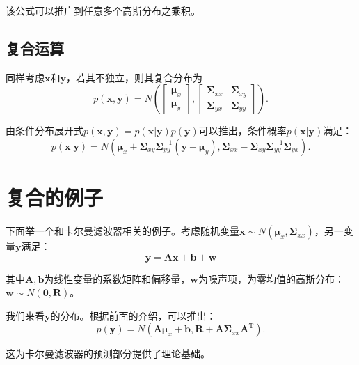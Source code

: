 该公式可以推广到任意多个高斯分布之乘积。

\subsection{复合运算}
同样考虑$\bm{x}$和$\bm{y}$，若其不独立，则其复合分布为
\begin{equation}
p(\bm{x}, \bm{y}) = N\left( {\left[ {\begin{array}{*{20}{c}}
		{{\bm{\mu}_x}}\\
		{{\bm{\mu}_y}}
		\end{array}} \right],\left[ {\begin{array}{*{20}{c}}
		{{\bm{\Sigma}_{xx}}}&{{\bm{\Sigma}_{xy}}}\\
		{{\bm{\Sigma}_{yx}}}&{{\bm{\Sigma}_{yy}}}
		\end{array}} \right]} \right).
\end{equation}

由条件分布展开式$p\left( {\bm{x}, \bm{y}} \right) = p\left( {\bm{x}|\bm{y}} \right)p\left( \bm{y} \right)$可以推出，条件概率$p(\bm{x}|\bm{y})$满足：
\begin{equation}
p\left( {\bm{x} | \bm{y} } \right) = N\left( {{\bm{\mu}_x} + {\bm{\Sigma}_{xy}} \bm{\Sigma}_{yy}^{ - 1} \left( {\bm{y} - {\bm{\mu}_y}} \right),{\bm{\Sigma}_{xx}} - {\bm{\Sigma}_{xy}} \bm{\Sigma}_{yy}^{ - 1}{\bm{\Sigma}_{yx}}} \right).
\end{equation}

\section{复合的例子}
\label{sec:gauss-example}
下面举一个和卡尔曼滤波器相关的例子。考虑随机变量$\bm{x} \sim N( \bm{\mu}_x, \bm{\Sigma}_{xx})$，另一变量$\bm{y}$满足：
\begin{equation}
\bm{y} = \bm{Ax} + \bm{b} + \bm{w}
\end{equation}

其中$\bm{A}, \bm{b}$为线性变量的系数矩阵和偏移量，$\bm{w}$为噪声项，为零均值的高斯分布：$\bm{w} \sim N(\bm{0}, \bm{R})$。

我们来看$\bm{y}$的分布。根据前面的介绍，可以推出：
\begin{equation}
p\left( \bm{y} \right) = N\left( {\bm{A}{\bm{\mu}_x} + \bm{b}, \bm{R} + \bm{A} {\bm{\Sigma}_{xx}}{\bm{A}^\mathrm{T}}} \right).
\end{equation}

这为卡尔曼滤波器的预测部分提供了理论基础。
